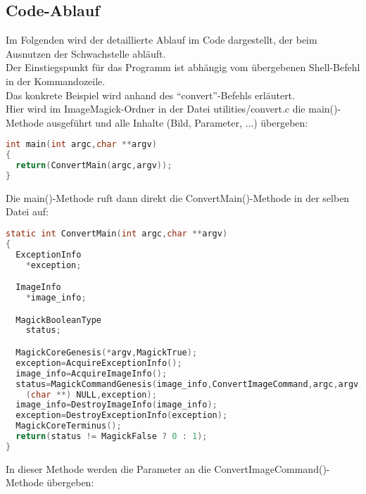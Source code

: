 \subsection{Code-Ablauf}\label{subsec:code-ablauf}

Im Folgenden wird der detaillierte Ablauf im Code dargestellt, der beim Ausnutzen der Schwachstelle abläuft.\\

Der Einstiegspunkt für das Programm ist abhängig vom übergebenen Shell-Befehl in der Kommandozeile.\\

Das konkrete Beispiel wird anhand des "`convert"'-Befehls erläutert.\\

Hier wird im ImageMagick-Ordner in der Datei utilities/convert.c die main()-Methode ausgeführt und alle Inhalte (Bild, Parameter, ...) übergeben:\\

\begin{lstlisting}[firstnumber=90, language=C, caption=utilities/convert.c Einstieg main(),label={lst:lstlisting}]
int main(int argc,char **argv)
{
  return(ConvertMain(argc,argv));
}
\end{lstlisting}
\vspace{5mm}

Die main()-Methode ruft dann direkt die ConvertMain()-Methode in der selben Datei auf:\\

\begin{lstlisting}[firstnumber=67, language=C, caption=utilities/convert.c ConvertMain(),label={lst:lstlisting}]
static int ConvertMain(int argc,char **argv)
{
  ExceptionInfo
    *exception;

  ImageInfo
    *image_info;

  MagickBooleanType
    status;

  MagickCoreGenesis(*argv,MagickTrue);
  exception=AcquireExceptionInfo();
  image_info=AcquireImageInfo();
  status=MagickCommandGenesis(image_info,ConvertImageCommand,argc,argv,
    (char **) NULL,exception);
  image_info=DestroyImageInfo(image_info);
  exception=DestroyExceptionInfo(exception);
  MagickCoreTerminus();
  return(status != MagickFalse ? 0 : 1);
}
\end{lstlisting}
\vspace{5mm}

In dieser Methode werden die Parameter an die ConvertImageCommand()-Methode übergeben:\\

